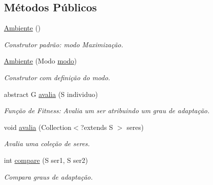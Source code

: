 \subsection*{Métodos Públicos}
\begin{DoxyCompactItemize}
\item 
\hyperlink{classic_1_1populacional_1_1_ambiente_3_01_g_01extends_01_number_01_6_comparable_3_01_g_01_4_00_01a5eb548f12ccc7dbff4cf5c498ddc51_ab798f4891bf5d913966cbc68e646c58f}{Ambiente} ()
\begin{DoxyCompactList}\small\item\em Construtor padrão\-: modo Maximização. \end{DoxyCompactList}\item 
\hyperlink{classic_1_1populacional_1_1_ambiente_3_01_g_01extends_01_number_01_6_comparable_3_01_g_01_4_00_01a5eb548f12ccc7dbff4cf5c498ddc51_aeedc08aac80259e2ff6f4524db8b5e07}{Ambiente} (Modo \hyperlink{classic_1_1populacional_1_1_ambiente_3_01_g_01extends_01_number_01_6_comparable_3_01_g_01_4_00_01a5eb548f12ccc7dbff4cf5c498ddc51_afdf6b3d04203015a78f9af1012306dff}{modo})
\begin{DoxyCompactList}\small\item\em Construtor com definição do modo. \end{DoxyCompactList}\item 
abstract G \hyperlink{classic_1_1populacional_1_1_ambiente_3_01_g_01extends_01_number_01_6_comparable_3_01_g_01_4_00_01a5eb548f12ccc7dbff4cf5c498ddc51_a77f4aed5f08c0c4cb6c74e15d9dc1c09}{avalia} (S individuo)
\begin{DoxyCompactList}\small\item\em Função de Fitness\-: Avalia um ser atribuindo um grau de adaptação. \end{DoxyCompactList}\item 
void \hyperlink{classic_1_1populacional_1_1_ambiente_3_01_g_01extends_01_number_01_6_comparable_3_01_g_01_4_00_01a5eb548f12ccc7dbff4cf5c498ddc51_aee3978452491ee78175d4679c2ffebd9}{avalia} (Collection$<$?extends S $>$ seres)
\begin{DoxyCompactList}\small\item\em Avalia uma coleção de seres. \end{DoxyCompactList}\item 
int \hyperlink{classic_1_1populacional_1_1_ambiente_3_01_g_01extends_01_number_01_6_comparable_3_01_g_01_4_00_01a5eb548f12ccc7dbff4cf5c498ddc51_af607dd2a04def8b6ad98835ce5f718d3}{compare} (S ser1, S ser2)
\begin{DoxyCompactList}\small\item\em Compara graus de adaptação. \end{DoxyCompactList}\item 

\end{DoxyCompactItemize}
